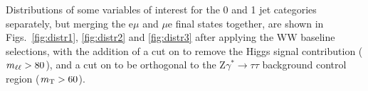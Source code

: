 Distributions of some variables of interest for the 0 and 1 jet categories separately, but merging the e$\mu$ and $\mu$e final states together, are shown in Figs.~\ref{fig:distr1}, \ref{fig:distr2} and \ref{fig:distr3} after applying the WW baseline selections, with the addition of a cut on \mll to remove the Higgs signal contribution ($m_{\ell\ell} > 80$\GeV), and a cut on \mt to be orthogonal to the $\mathrm{Z}\gamma^* \to \tau\tau$ background control region ($m_\mathrm{T} > 60$\GeV).

\begin{figure}
\centering
{}
\\
\end{figure}
